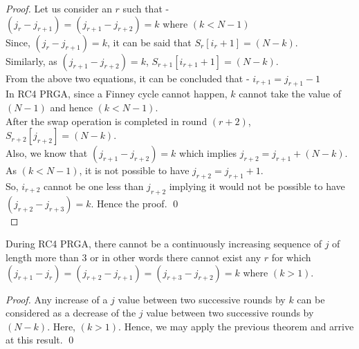 \documentclass{llncs}
\begin{document}
\begin{proof}

Let us consider an $r$ such that -\\

$(j_{r} - j_{r+1}) = (j_{r+1} - j_{r+2}) = k$ where $(k < N-1)$ \\

\noindent Since, $(j_{r} - j_{r+1}) = k$, it can be said that $S_{r}[i_{r}+1] = (N-k)$. \\

\noindent Similarly, as $(j_{r+1} - j_{r+2}) = k$, $S_{r+1}[i_{r+1}+1] = (N-k)$. \\

\noindent From the above two equations, it can be concluded that -
$i_{r+1} = j_{r+1}-1$ \\

In RC4 PRGA, since a Finney cycle cannot happen, $k$ cannot take the value of $(N-1)$ and hence $(k < N-1)$. \\

\noindent After the swap operation is completed in round $(r+2)$, 
$S_{r+2}[j_{r+2}] = (N-k)$. \\

\noindent Also, we know that $(j_{r+1} - j_{r+2}) = k$ which implies 
$j_{r+2} = j_{r+1} + (N-k)$. \\

\noindent As $(k < N-1)$, it is not possible to have $j_{r+2} = j_{r+1} + 1$. \\

So, $i_{r+2}$ cannot be one less than $j_{r+2}$ implying it would not be possible to have $(j_{r+2} - j_{r+3}) = k$. Hence the proof. \qed \\

\end{proof}

\begin{corollary}

During RC4 PRGA, there cannot be a continuously increasing sequence of $j$ of length more than $3$ or in other words there cannot exist any $r$ for which $(j_{r+1} - j_{r}) = (j_{r+2} - j_{r+1}) = (j_{r+3} - j_{r+2}) = k$ where $(k > 1)$. 
\end{corollary} 

\begin{proof}

Any increase of a $j$ value between two successive rounds by $k$ can be considered as a decrease of the $j$ value between two successive rounds by $(N-k)$. Here, $(k > 1)$. Hence, we may apply the previous theorem and arrive at this result. \qed

\end{proof}
\end{document}
